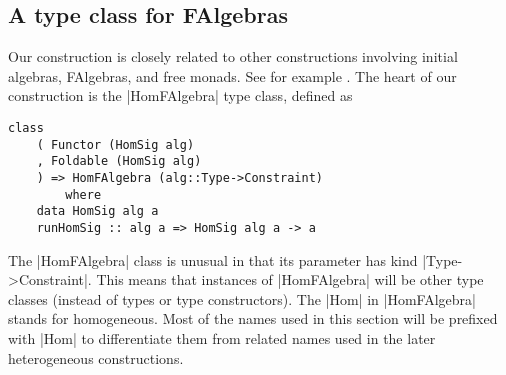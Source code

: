 \documentclass[preprint]{sigplanconf}
\theoremstyle{definition}
\begin{document}
%
%
%
%

\subsection{A type class for FAlgebras}
Our construction is closely related to other constructions involving initial algebras, FAlgebras, and free monads.
See for example \cite{swierstra2008}.
The heart of our construction is the |HomFAlgebra| type class, defined as
\begin{lstlisting}
class
    ( Functor (HomSig alg)
    , Foldable (HomSig alg)
    ) => HomFAlgebra (alg::Type->Constraint)
        where
    data HomSig alg a
    runHomSig :: alg a => HomSig alg a -> a
\end{lstlisting}
The |HomFAlgebra| class is unusual in that its parameter has kind |Type->Constraint|.
This means that instances of |HomFAlgebra| will be other type classes (instead of types or type constructors).
The |Hom| in |HomFAlgebra| stands for homogeneous.
Most of the names used in this section will be prefixed with |Hom| to differentiate them from related names used in the later heterogeneous constructions.
\end{document}
